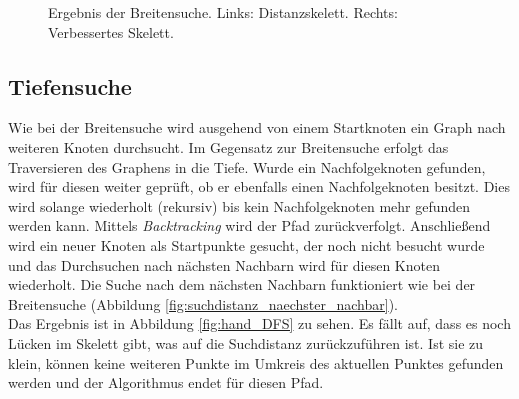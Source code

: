 \begin{figure}[htbp]
\begin{minipage}{5cm}
	\end{minipage}
	\caption{Ergebnis der Breitensuche. Links: Distanzskelett. Rechts: Verbessertes Skelett.}
	\label{fig:hand_BFS}
	\end{figure}
\FloatBarrier
\subsection{Tiefensuche}
\label{subsec:tiefensuche}
Wie bei der Breitensuche wird ausgehend von einem Startknoten ein Graph nach weiteren Knoten durchsucht. 
Im Gegensatz zur Breitensuche erfolgt das Traversieren des Graphens in die Tiefe. Wurde ein Nachfolgeknoten
gefunden, wird für diesen weiter geprüft, ob er ebenfalls einen Nachfolgeknoten besitzt. Dies wird
solange wiederholt (rekursiv) bis kein Nachfolgeknoten mehr gefunden werden kann. Mittels \emph{Backtracking} wird der Pfad zurückverfolgt. Anschließend wird ein neuer Knoten als Startpunkte gesucht, der noch nicht besucht wurde und das Durchsuchen nach nächsten Nachbarn wird für diesen Knoten wiederholt. Die Suche nach dem nächsten Nachbarn funktioniert wie bei der Breitensuche (Abbildung \ref{fig:suchdistanz_naechster_nachbar}). \\
Das Ergebnis ist in Abbildung \ref{fig:hand_DFS} zu sehen. Es fällt auf, dass es noch Lücken im Skelett gibt, was auf die Suchdistanz zurückzuführen ist. Ist sie zu klein, können keine weiteren Punkte im Umkreis des aktuellen Punktes gefunden werden und der Algorithmus endet für diesen Pfad. 
